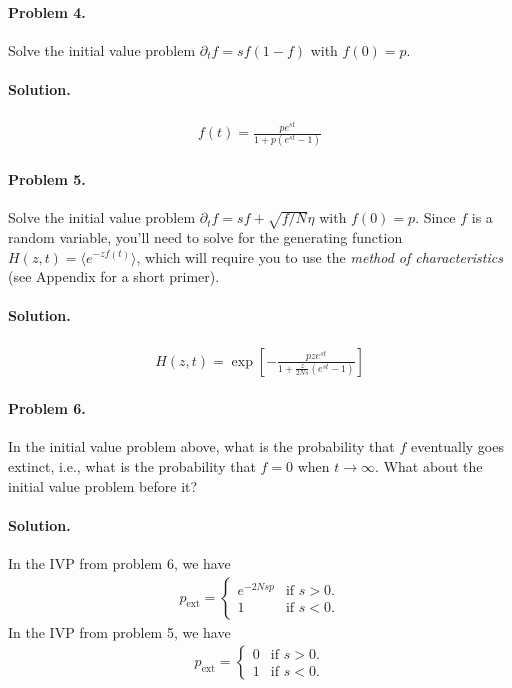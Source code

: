 \documentclass[11pt]{article}
\begin{document}
\paragraph{Problem 4.} Solve the initial value problem $\partial_t f = sf(1-f)$ with $f(0) = p$. 

\paragraph{Solution.}
\begin{align}
f(t) = \frac{p e^{st}}{1+p \left( e^{st}-1 \right)} 
\end{align}

\paragraph{Problem 5.} Solve the initial value problem $\partial_t f = s f + \sqrt{f/N} \eta$ with $f(0) = p$. Since $f$ is a random variable, you'll need to solve for the generating function $H(z,t) = \langle e^{-z f(t) } \rangle$, which will require you to use the \emph{method of characteristics} (see Appendix for a short primer).

\paragraph{Solution.} 
\begin{align}
H(z,t) = \exp \left[ - \frac{p z e^{st}}{1+\frac{z}{2Ns} \left( e^{st} - 1 \right)} \right]
\end{align}

\paragraph{Problem 6.} In the initial value problem above, what is the probability that $f$ eventually goes extinct, i.e., what is the probability that $f=0$ when $t \to \infty$. What about the initial value problem before it?

\paragraph{Solution.}
In the IVP from problem 6, we have
\begin{align}
p_\mathrm{ext} = \begin{cases}
e^{-2Nsp} & \text{if $s > 0$.} \\
1 & \text{if $s < 0$.}
\end{cases}
\end{align}
In the IVP from problem 5, we have
\begin{align}
p_\mathrm{ext} = \begin{cases}
0 & \text{if $s > 0$.} \\
1 & \text{if $s < 0$.}
\end{cases}
\end{align}
\end{document}
